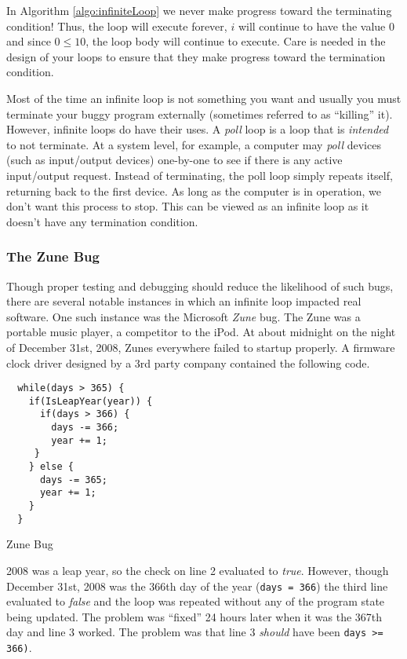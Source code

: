 In Algorithm \ref{algo:infiniteLoop} we never make progress toward the terminating
condition!  Thus, the loop will execute forever, $i$ will continue to have the value 0
and since $0 \leq 10$, the loop body will continue to execute.  Care is needed in the
design of your loops to ensure that they make progress toward the termination condition.

Most of the time an infinite loop is not something you want and usually you must 
terminate your buggy program externally (sometimes referred to as ``killing'' it).  
However, infinite loops do have their uses.  A \emph{poll} loop is a loop that is
\emph{intended} to not terminate.  At a system level, for example, a computer
may \emph{poll} devices (such as input/output devices) one-by-one to see if
there is any active input/output request.  Instead of terminating, the poll loop
simply repeats itself, returning back to the first device.  As long as the computer
is in operation, we don't want this process to stop.  This can be viewed as an 
infinite loop as it doesn't have any termination condition.

\subsubsection{The Zune Bug}
\label{subsubsection:zuneBug}

Though proper testing and debugging should reduce the likelihood of such bugs,
there are several notable instances in which an infinite loop impacted real 
software.  One such instance was the Microsoft \emph{Zune} bug.  The Zune
was a portable music player, a competitor to the iPod.  At about midnight on 
the night of December 31st, 2008, Zunes everywhere failed to startup properly.
A firmware clock driver designed by a 3rd party company contained the following
code. 

\begin{listing}[!h]
\begin{verbatim}
  while(days > 365) {
    if(IsLeapYear(year)) {
      if(days > 366) {
        days -= 366;
        year += 1;
     }
    } else {
      days -= 365;
      year += 1;
    }
  }
\end{verbatim}
  \caption{Zune Bug}
  \label{code:c:zuneBug}
\end{listing}

2008 was a leap year, so the check on line 2 evaluated to \emph{true}.
However, though December 31st, 2008 was the 366th day of the year (\texttt{days = 366})
the third line evaluated to \emph{false} and the loop was repeated without any of
the program state being updated.  The problem was ``fixed'' 24 hours later when 
it was the 367th day and line 3 worked.  The problem was that line 3 \emph{should} have been
\texttt{days >= 366)}.  

